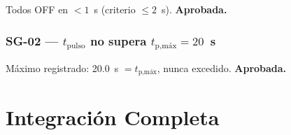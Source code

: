 \begin{table}[H]
\centering
\caption{Estado de actuadores tras cierre de la aplicación.}
\label{tab:sg01}
\renewcommand{\arraystretch}{1.3}\small
{}
\end{table}

\noindent Todos OFF en $< 1$~s (criterio $\leq 2$~s). \textbf{Aprobada.}

\subsubsection*{SG-02 --- $t_\text{pulso}$ no supera $t_\text{p,máx} = 20$~s}

\begin{table}[H]
\centering
\caption{Verificación del límite superior del tiempo de pulso.}
\label{tab:sg02}
\renewcommand{\arraystretch}{1.3}\small
{}
\end{table}

\noindent Máximo registrado: 20.0~s $= t_\text{p,máx}$, nunca excedido. \textbf{Aprobada.}

\section{Integración Completa}

